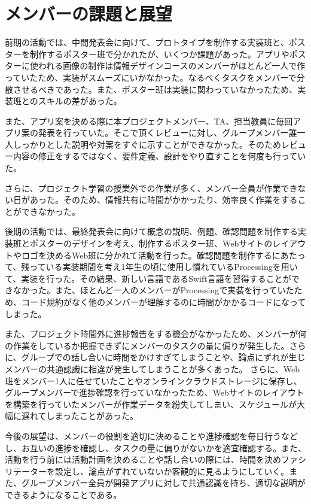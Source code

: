 \documentclass[openany,11pt,papersize]{jsbook}
\begin{document}
\section{メンバーの課題と展望}
前期の活動では、中間発表会に向けて、プロトタイプを制作する実装班と、ポスターを制作するポスター班で分かれたが、いくつか課題があった。アプリやポスターに使われる画像の制作は情報デザインコースのメンバーがほとんど一人で作っていたため、実装がスムーズにいかなかった。なるべくタスクをメンバーで分散させるべきであった。また、ポスター班は実装に関わっていなかったため、実装班とのスキルの差があった。
\par
また、アプリ案を決める際に本プロジェクトメンバー、TA、担当教員に毎回アプリ案の発表を行っていた。そこで頂くレビューに対し、グループメンバー誰一人しっかりとした説明や対案をすぐに示すことができなかった。そのためレビュー内容の修正をするではなく、要件定義、設計をやり直すことを何度も行っていた。
\par
さらに、プロジェクト学習の授業外での作業が多く、メンバー全員が作業できない日があった。そのため、情報共有に時間がかかったり、効率良く作業をすることができなかった。
\par
後期の活動では、最終発表会に向けて概念の説明、例題、確認問題を制作する実装班とポスターのデザインを考え、制作するポスター班、Webサイトのレイアウトやロゴを決めるWeb班に分かれて活動を行った。確認問題を制作するにあたって、残っている実装期間を考え1年生の頃に使用し慣れているProcessingを用いて、実装を行った。その結果、新しい言語であるSwift言語を習得することができなかった。また、ほとんど一人のメンバーがProcessingで実装を行っていたため、コード規約がなく他のメンバーが理解するのに時間がかかるコードになってしまった。
\par
また、プロジェクト時間外に進捗報告をする機会がなかったため、メンバーが何の作業をしているか把握できずにメンバーのタスクの量に偏りが発生した。さらに、グループでの話し合いに時間をかけすぎてしまうことや、論点にずれが生じメンバーの共通認識に相違が発生してしまうことが多くあった。
さらに、Web班をメンバー1人に任せていたことやオンラインクラウドストレージに保存し、グループメンバーで進捗確認を行っていなかったため、Webサイトのレイアウトを構築を行っていたメンバーが作業データを紛失してしまい、スケジュールが大幅に遅れてしまったことがあった。

\par
今後の展望は、メンバーの役割を適切に決めることや進捗確認を毎日行うなどし、お互いの進捗を確認し、タスクの量に偏りがないかを適宜確認する。また、活動を行う前には活動計画を決めることや話し合いの際には、時間を決めファシリテーターを設定し、論点がずれていないか客観的に見るようにしていく。また、グループメンバー全員が開発アプリに対して共通認識を持ち、適切な説明ができるようになることである。
\end{document}
